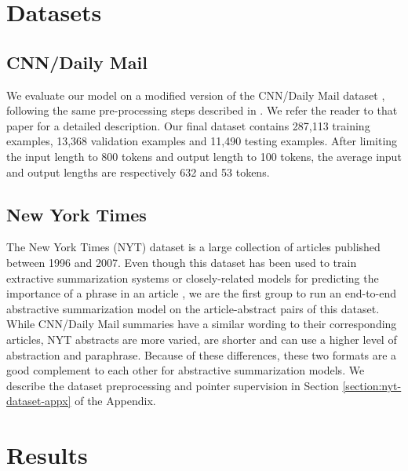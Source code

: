 \documentclass{article} \usepackage{iclr2018_arxiv,times}
\begin{document}
\section{Datasets}
\label{sec:datasets}

\subsection{CNN/Daily Mail}

We evaluate our model on a modified version of the CNN/Daily Mail dataset \citep{hermann2015}, following the same pre-processing steps described in \citet{nallapati2016}. We refer the reader to that paper for a detailed description. Our final dataset contains 287,113 training examples, 13,368 validation examples and 11,490 testing examples. After limiting the input length to 800 tokens and output length to 100 tokens, the average input and output lengths are respectively 632 and 53 tokens.

\subsection{New York Times}

The New York Times (NYT) dataset \citep{sandhaus2008} is a large collection of articles published between 1996 and 2007. Even though this dataset has been used to train extractive summarization systems \citep{durrett2016learning,hong2014,li2016} or closely-related models for predicting the importance of a phrase in an article \citep{yang2014,nye2015,hong2015}, we are the first group to run an end-to-end abstractive summarization model on the article-abstract pairs of this dataset. While CNN/Daily Mail summaries have a similar wording to their corresponding articles, NYT abstracts are more varied, are shorter and can use a higher level of abstraction and paraphrase. Because of these differences, these two formats are a good complement to each other for abstractive summarization models. We describe the dataset preprocessing and pointer supervision in Section \ref{section:nyt-dataset-appx} of the Appendix.

\section{Results}
\label{sec:results}
\end{document}
